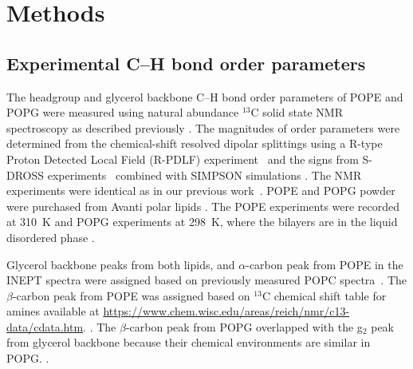 \documentclass[aps,prl,superscriptaddress,twocolumn]{revtex4}
\begin{document}
\section{Methods}
\subsection{Experimental C--H bond order parameters}
The headgroup and glycerol backbone C--H bond order parameters of POPE and POPG
were measured using natural abundance $^{13}$C solid state NMR spectroscopy
as described previously \cite{ferreira13,ferreira16}.
The magnitudes of order parameters were determined from the chemical-shift resolved dipolar splittings
using a R-type Proton Detected Local Field (R-PDLF) experiment~\cite{dvinskikh04} and
the signs from S-DROSS experiments~\cite{gross97} combined with SIMPSON simulations \cite{bak00}.
The NMR experiments were identical as in our previous work~\cite{antila19}.
POPE and POPG powder were purchased from Avanti polar lipids .
The POPE experiments were recorded at 310~K and POPG experiments at 298~K, where the bilayers are in the liquid disordered phase \cite{marsh13}.


Glycerol backbone peaks from both lipids, and $\alpha$-carbon peak from POPE in the INEPT spectra 
were assigned based on previously measured POPC spectra~\cite{ferreira13}.
The $\beta$-carbon peak from POPE was assigned based on $^{13}$C chemical shift table for amines available
at \url{https://www.chem.wisc.edu/areas/reich/nmr/c13-data/cdata.htm}.
.
The $\beta$-carbon peak from POPG overlapped with the g$_2$ peak from glycerol backbone
because their chemical environments are similar in POPG.
.
\end{document}
